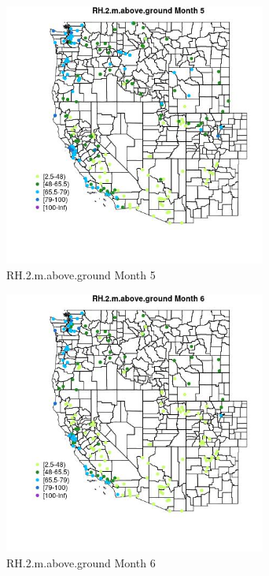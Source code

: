 \begin{figure} 
\centering  
\includegraphics[width=0.77\textwidth]{Code_Outputs/Report_ML_input_PM25_Step4_part_e_de_duplicated_aveswNAs_MapObsMo5RH2maboveground.jpg} 
\caption{\label{fig:Report_ML_input_PM25_Step4_part_e_de_duplicated_aveswNAsMapObsMo5RH2maboveground}RH.2.m.above.ground Month 5} 
\end{figure} 
 

\begin{figure} 
\centering  
\includegraphics[width=0.77\textwidth]{Code_Outputs/Report_ML_input_PM25_Step4_part_e_de_duplicated_aveswNAs_MapObsMo6RH2maboveground.jpg} 
\caption{\label{fig:Report_ML_input_PM25_Step4_part_e_de_duplicated_aveswNAsMapObsMo6RH2maboveground}RH.2.m.above.ground Month 6} 
\end{figure} 
 

